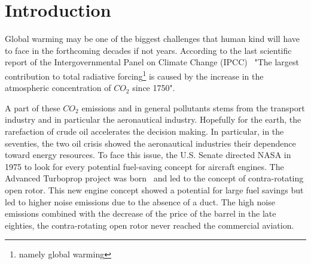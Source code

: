 
\chapter{Introduction}

Global warming may be one of the biggest challenges that human kind
will have to face in the forthcoming decades if not years.
According to the last scientific
report of the Intergovernmental Panel on Climate Change 
(IPCC)~\cite{IPCC2013}
"The largest contribution to total radiative 
forcing\footnote{namely global warming} 
is caused by the increase in the atmospheric 
concentration of $CO_2$ since 1750".

A part of these $CO_2$ emissions and in general pollutants stems from the
transport industry and in particular the
aeronautical industry. 
Hopefully for the earth,
the rarefaction of crude oil accelerates the decision making.
In particular, in the seventies, the two oil crisis showed the aeronautical 
industries their dependence toward energy resources. 
To face this issue, the U.S. Senate directed NASA in 1975
to look for every potential fuel-saving concept for aircraft
engines. The Advanced Turboprop
project was born~\cite{Hager1988} and led to the
concept of contra-rotating open rotor. This new
engine concept showed a potential for large fuel savings
but led to higher noise emissions due to the absence of
a duct. The high noise emissions 
combined with the decrease of the price of the
barrel in the late eighties, the contra-rotating open rotor 
never reached the commercial aviation.

